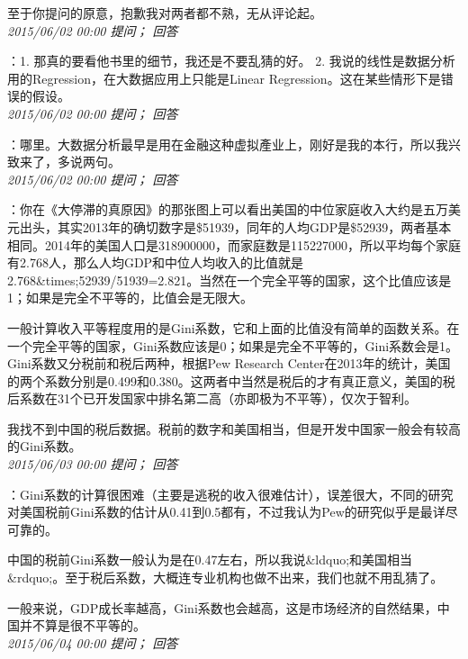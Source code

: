 \documentclass[twocolumn]{ctexart}
\begin{document}
至于你提问的原意，抱歉我对两者都不熟，无从评论起。\\

\textit{\hfill\noindent\small 2015/06/02 00:00 提问； 回答}

：1. 那真的要看他书里的细节，我还是不要乱猜的好。
2. 我说的线性是数据分析用的Regression，在大数据应用上只能是Linear Regression。这在某些情形下是错误的假设。\\

\textit{\hfill\noindent\small 2015/06/02 00:00 提问； 回答}

：哪里。大数据分析最早是用在金融这种虚拟產业上，刚好是我的本行，所以我兴致来了，多说两句。\\

\textit{\hfill\noindent\small 2015/06/02 00:00 提问； 回答}

：你在《大停滞的真原因》的那张图上可以看出美国的中位家庭收入大约是五万美元出头，其实2013年的确切数字是\$51939，同年的人均GDP是\$52939，两者基本相同。2014年的美国人口是318900000，而家庭数是115227000，所以平均每个家庭有2.768人，那么人均GDP和中位人均收入的比值就是2.768\&times;52939/51939=2.821。当然在一个完全平等的国家，这个比值应该是1；如果是完全不平等的，比值会是无限大。

一般计算收入平等程度用的是Gini系数，它和上面的比值没有简单的函数关系。在一个完全平等的国家，Gini系数应该是0；如果是完全不平等的，Gini系数会是1。Gini系数又分税前和税后两种，根据Pew Research Center在2013年的统计，美国的两个系数分别是0.499和0.380。这两者中当然是税后的才有真正意义，美国的税后系数在31个已开发国家中排名第二高（亦即极为不平等），仅次于智利。

我找不到中国的税后数据。税前的数字和美国相当，但是开发中国家一般会有较高的Gini系数。\\

\textit{\hfill\noindent\small 2015/06/03 00:00 提问； 回答}

：Gini系数的计算很困难（主要是逃税的收入很难估计），误差很大，不同的研究对美国税前Gini系数的估计从0.41到0.5都有，不过我认为Pew的研究似乎是最详尽可靠的。

中国的税前Gini系数一般认为是在0.47左右，所以我说\&ldquo;和美国相当\&rdquo;。至于税后系数，大概连专业机构也做不出来，我们也就不用乱猜了。

一般来说，GDP成长率越高，Gini系数也会越高，这是市场经济的自然结果，中国并不算是很不平等的。\\

\textit{\hfill\noindent\small 2015/06/04 00:00 提问； 回答}
\end{document}

